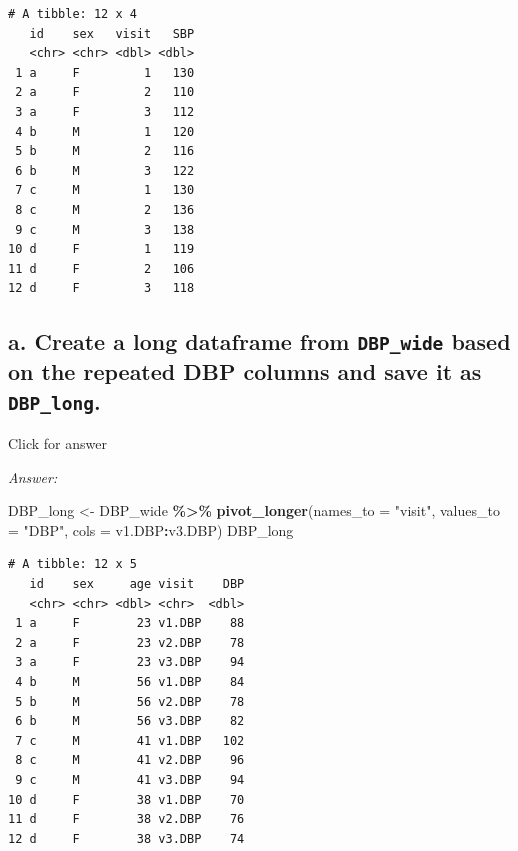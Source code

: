\documentclass[
]{book}
\newenvironment{Shaded}{\begin{snugshade}}{\end{snugshade}}
\newcommand{\AttributeTok}[1]{\textcolor[rgb]{0.13,0.29,0.53}{#1}}
\newcommand{\FunctionTok}[1]{\textcolor[rgb]{0.13,0.29,0.53}{\textbf{#1}}}
\newcommand{\NormalTok}[1]{#1}
\newcommand{\OtherTok}[1]{\textcolor[rgb]{0.56,0.35,0.01}{#1}}
\newcommand{\SpecialCharTok}[1]{\textcolor[rgb]{0.81,0.36,0.00}{\textbf{#1}}}
\newcommand{\StringTok}[1]{\textcolor[rgb]{0.31,0.60,0.02}{#1}}
\begin{document}
\begin{verbatim}
# A tibble: 12 x 4
   id    sex   visit   SBP
   <chr> <chr> <dbl> <dbl>
 1 a     F         1   130
 2 a     F         2   110
 3 a     F         3   112
 4 b     M         1   120
 5 b     M         2   116
 6 b     M         3   122
 7 c     M         1   130
 8 c     M         2   136
 9 c     M         3   138
10 d     F         1   119
11 d     F         2   106
12 d     F         3   118
\end{verbatim}

\hypertarget{a.-create-a-long-dataframe-from-dbp_wide-based-on-the-repeated-dbp-columns-and-save-it-as-dbp_long.}{%
\subsection{\texorpdfstring{a. Create a long dataframe from \texttt{DBP\_wide} based on the repeated DBP columns and save it as \texttt{DBP\_long}.}{a. Create a long dataframe from DBP\_wide based on the repeated DBP columns and save it as DBP\_long.}}\label{a.-create-a-long-dataframe-from-dbp_wide-based-on-the-repeated-dbp-columns-and-save-it-as-dbp_long.}}

Click for answer

\emph{Answer:}

\begin{Shaded}
\begin{Highlighting}[]
\NormalTok{DBP\_long }\OtherTok{\textless{}{-}}\NormalTok{ DBP\_wide }\SpecialCharTok{\%\textgreater{}\%}
  \FunctionTok{pivot\_longer}\NormalTok{(}\AttributeTok{names\_to =} \StringTok{"visit"}\NormalTok{,}
               \AttributeTok{values\_to =} \StringTok{"DBP"}\NormalTok{,}
               \AttributeTok{cols =}\NormalTok{ v1.DBP}\SpecialCharTok{:}\NormalTok{v3.DBP)}
\NormalTok{DBP\_long}
\end{Highlighting}
\end{Shaded}

\begin{verbatim}
# A tibble: 12 x 5
   id    sex     age visit    DBP
   <chr> <chr> <dbl> <chr>  <dbl>
 1 a     F        23 v1.DBP    88
 2 a     F        23 v2.DBP    78
 3 a     F        23 v3.DBP    94
 4 b     M        56 v1.DBP    84
 5 b     M        56 v2.DBP    78
 6 b     M        56 v3.DBP    82
 7 c     M        41 v1.DBP   102
 8 c     M        41 v2.DBP    96
 9 c     M        41 v3.DBP    94
10 d     F        38 v1.DBP    70
11 d     F        38 v2.DBP    76
12 d     F        38 v3.DBP    74
\end{verbatim}
\end{document}
